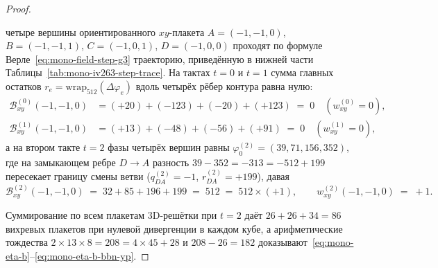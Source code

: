 \begin{proof}
\begin{enumerate}[label=\textbf{\arabic*.},leftmargin=*]
  четыре вершины ориентированного $xy$-плакета $A=(-1,-1,0)$, $B=(-1,-1,1)$, $C=(-1,0,1)$, $D=(-1,0,0)$ проходят по формуле Верле~\eqref{eq:mono-field-step-g3} траекторию, приведённую в нижней части Таблицы~\ref{tab:mono-iv263-step-trace}. На тактах $t = 0$ и $t = 1$ сумма главных остатков $r_e = \mathrm{wrap}_{512}(\Delta\varphi_e)$ вдоль четырёх рёбер контура равна нулю:
  \begin{align*}
    \mathcal{B}_{xy}^{(0)}(-1,-1,0) &= (+20) + (-123) + (-20) + (+123) \;=\; 0 \quad (w_{xy}^{(0)} = 0), \\
    \mathcal{B}_{xy}^{(1)}(-1,-1,0) &= (+13) + (-48) + (-56) + (+91) \;=\; 0 \quad (w_{xy}^{(1)} = 0),
  \end{align*}
  а на втором такте $t = 2$ фазы четырёх вершин равны $\varphi_0^{(2)} = (39, 71, 156, 352)$, где на замыкающем ребре $D \to A$ разность $39 - 352 = -313 = -512 + 199$ пересекает границу смены ветви ($q_{DA}^{(2)} = -1$, $r_{DA}^{(2)} = +199$), давая
  \[
    \mathcal{B}_{xy}^{(2)}(-1,-1,0) \;=\; 32 + 85 + 196 + 199 \;=\; 512 \;=\; 512 \times (+1), \qquad
    w_{xy}^{(2)}(-1,-1,0) \;=\; +1.
  \]
\end{enumerate}
Суммирование по всем плакетам 3D-решётки при $t = 2$ даёт $26 + 26 + 34 = 86$ вихревых плакетов при нулевой дивергенции в каждом кубе, а арифметические тождества $2\times 13\times 8 = 208 = 4\times 45 + 28$ и $208 - 26 = 182$ доказывают~\eqref{eq:mono-eta-b}--\eqref{eq:mono-eta-b-bbn-yp}.
\end{proof}

